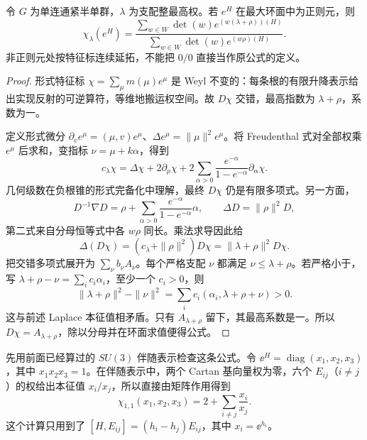 \begin{theorem}
令 $G$ 为单连通紧半单群，$\lambda$ 为支配整最高权。若 $e^H$ 在最大环面中为正则元，则
\begin{equation}
 \chi_\lambda(e^H)=
 \frac{\sum_{w\in W}\det(w)e^{(w(\lambda+\rho))(H)}}
 {\sum_{w\in W}\det(w)e^{(w\rho)(H)}}.
 \label{eq:weyl-character}
\end{equation}
非正则元处按特征标连续延拓，不能把 $0/0$ 直接当作原公式的定义。
\end{theorem}
\begin{proof}
形式特征标 $\chi=\sum_\mu m(\mu)e^\mu$ 是 Weyl 不变的：每条根的有限升降表示给出实现反射的可逆算符，等维地搬运权空间。故 $D\chi$ 交错，最高指数为 $\lambda+\rho$，系数为一。

定义形式微分 $\partial_v e^\mu=(\mu,v)e^\mu$、$\Delta e^\mu=\|\mu\|^2e^\mu$。将 Freudenthal 式对全部权乘 $e^\mu$ 后求和，变指标 $\nu=\mu+k\alpha$，得到
\[
 c_\lambda\chi=\Delta\chi+2\partial_\rho\chi
 +2\sum_{\alpha>0}\frac{e^{-\alpha}}{1-e^{-\alpha}}\partial_\alpha\chi.
\]
几何级数在负根锥的形式完备化中理解，最终 $D\chi$ 仍是有限多项式。另一方面，
\[
 D^{-1}\nabla D=\rho+\sum_{\alpha>0}\frac{e^{-\alpha}}{1-e^{-\alpha}}\alpha,
 \qquad \Delta D=\|\rho\|^2D,
\]
第二式来自分母恒等式中各 $w\rho$ 同长。乘法求导因此给
\[
 \Delta(D\chi)=(c_\lambda+\|\rho\|^2)D\chi
 =\|\lambda+\rho\|^2D\chi.
\]
把交错多项式展开为 $\sum_\nu b_\nu A_\nu$。每个严格支配 $\nu$ 都满足 $\nu\le\lambda+\rho$。若严格小于，写 $\lambda+\rho-\nu=\sum_i c_i\alpha_i$，至少一个 $c_i>0$，则
\[
 \|\lambda+\rho\|^2-\|\nu\|^2
 =\sum_i c_i(\alpha_i,\lambda+\rho+\nu)>0.
\]
这与前述 Laplace 本征值相矛盾。只有 $A_{\lambda+\rho}$ 留下，其最高系数是一。所以 $D\chi=A_{\lambda+\rho}$，除以分母并在环面求值便得公式。
\end{proof}


先用前面已经算过的 $SU(3)$ 伴随表示检查这条公式。令
$\ee^H=\operatorname{diag}(x_1,x_2,x_3)$，其中
$x_1x_2x_3=1$。在伴随表示中，两个 Cartan 基向量权为零，六个
$E_{ij}$（$i\ne j$）的权给出本征值 $x_i/x_j$，所以直接由矩阵作用得到
\begin{equation}
\chi_{1,1}(x_1,x_2,x_3)
=2+\sum_{i\ne j}\frac{x_i}{x_j}.
\label{eq:su3-adjoint-character-direct}
\end{equation}
这个计算只用到了 $[H,E_{ij}]=(h_i-h_j)E_{ij}$，其中 $x_i=\ee^{h_i}$。

